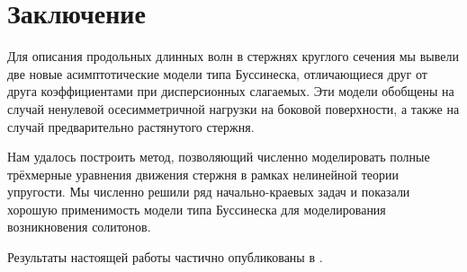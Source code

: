 \documentclass[12pt, a4paper]{article}
\begin{document}
\section{Заключение}

Для описания продольных длинных волн в стержнях круглого сечения мы вывели две новые асимптотические модели типа Буссинеска, отличающиеся друг от друга коэффициентами при дисперсионных слагаемых. Эти модели обобщены на случай ненулевой осесимметричной нагрузки на боковой поверхности, а также на случай предварительно растянутого стержня.

Нам удалось построить метод, позволяющий численно моделировать полные трёхмерные уравнения движения стержня в рамках нелинейной теории упругости. Мы численно решили ряд начально-краевых задач и показали хорошую применимость модели типа Буссинеска для моделирования возникновения солитонов.

Результаты настоящей работы частично опубликованы в \cite{Garbuzov}.


\let\OLDthebibliography\thebibliography
\renewcommand\thebibliography[1]{
	\OLDthebibliography{#1}
	\setlength{\parskip}{0pt}
	\setlength{\itemsep}{0pt plus 0.3ex}
}
\end{document}

